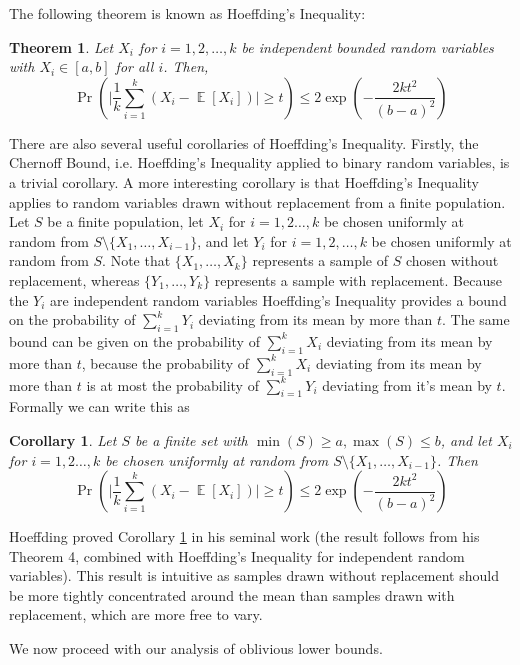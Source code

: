 \documentclass[twocolumn]{article}[10pt]
\DeclareMathOperator{\E}{\mathbb{E}}
\newtheorem{corollary}{Corollary}
\newtheorem{theorem}{Theorem}
\begin{document}
The following theorem is known as Hoeffding's Inequality:
\begin{theorem}
  Let $X_i$ for $i=1,2,\ldots, k$ be independent bounded random variables with
  $X_i \in [a,b]$ for all $i$. Then,
  $$\Pr\left(\Big|\frac{1}{k} \sum_{i=1}^k (X_i - \E[X_i])\Big|\ge t\right) \le
  2\exp\left(-\frac{2kt^2}{(b-a)^2}\right) $$
\end{theorem}
There are also several useful corollaries of Hoeffding's Inequality. 
Firstly, the Chernoff Bound, i.e. Hoeffding's Inequality applied to binary
random variables, is a trivial corollary.
A more interesting corollary is that Hoeffding's Inequality applies to random
variables drawn without replacement from a finite population.
Let $S$ be a finite population, let $X_i$ for $i=1,2\ldots, k$ be chosen
uniformly at random from $S \setminus \{X_1,\ldots, X_{i-1}\}$, and let $Y_i$
for $i=1,2,\ldots, k$ be chosen uniformly at random from $S$.
Note that $\{X_1,\ldots, X_k\}$ represents a sample of $S$ chosen without
replacement, whereas $\{Y_1,\ldots, Y_k\}$ represents a sample with
replacement. Because the $Y_i$ are independent random variables
Hoeffding's Inequality provides a bound on the probability of $\sum_{i=1}^k
Y_i$ deviating from its mean by more than $t$.
The same bound can be given on the probability of $\sum_{i=1}^k X_i$ deviating
from its mean by more than $t$, because the probability of $\sum_{i=1}^k X_i$
deviating from its mean by more than $t$ is at most the probability of
$\sum_{i=1}^k Y_i$ deviating from it's mean by $t$.
Formally we can write this as 
\begin{corollary}
  \label{cor:hoeffdingwreplacement}
  Let $S$ be a finite set with $\min(S) \ge a, \max(S) \le b$, and let $X_i$
  for $i=1,2\ldots, k$ be chosen uniformly at random from $S \setminus
  \{X_1,\ldots, X_{i-1}\}$.
Then 
  $$\Pr\left(\Big|\frac{1}{k} \sum_{i=1}^k (X_i - \E[X_i])\Big|\ge t\right) \le
  2\exp\left(-\frac{2kt^2}{(b-a)^2}\right) $$
\end{corollary}
Hoeffding proved Corollary \ref{cor:hoeffdingwreplacement} in his seminal work
\cite{who62} (the result follows from his Theorem 4, combined with Hoeffding's
Inequality for independent random variables).
This result is intuitive as samples drawn without replacement should be more
tightly concentrated around the mean than samples drawn with replacement, which
are more free to vary.

We now proceed with our analysis of oblivious lower bounds.
\end{document}
